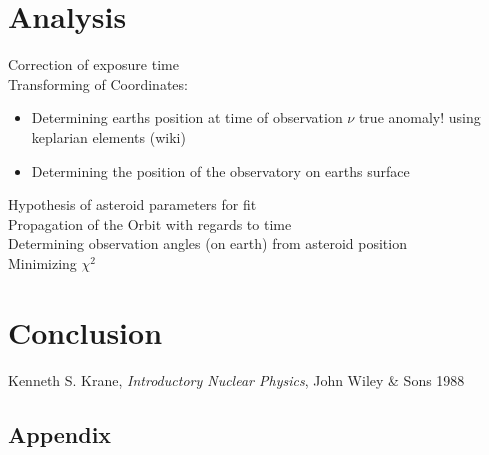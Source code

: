 \documentclass[11pt, a4paper]{article}
\numberwithin{equation}{section}
\begin{document}
\section{Analysis}

Correction of exposure time\\
Transforming of Coordinates:
\begin{itemize}
	\item Determining earths position at time of observation $\nu$ true anomaly! using keplarian elements (wiki)
	
	\item Determining the position of the observatory on earths surface
\end{itemize}
Hypothesis of asteroid parameters for fit\\
Propagation of the Orbit with regards to time\\
Determining observation angles (on earth) from asteroid position\\
Minimizing $\chi^2$




\section{Conclusion}


\FloatBarrier
\vspace{\fill}
\begin{thebibliography}{19}

	Kenneth S. Krane,
	\emph{Introductory Nuclear Physics},
	John Wiley \& Sons 1988

\end{thebibliography}

\begin{appendix}
\section{Appendix}

\end{appendix}
\end{document}
